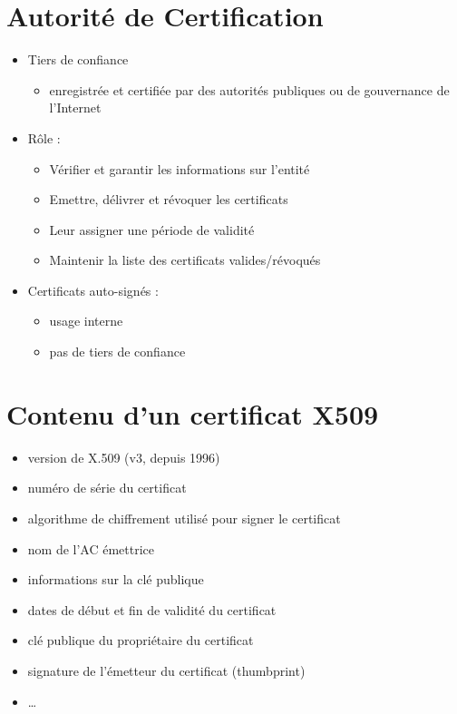 \hypertarget{autorituxe9-de-certification}{%
\section{Autorité de Certification}\label{autorituxe9-de-certification}}

\begin{itemize}
\tightlist
\item
  Tiers de confiance

  \begin{itemize}
  \tightlist
  \item
    enregistrée et certifiée par des autorités publiques ou de
    gouvernance de l'Internet
  \end{itemize}
\item
  Rôle :

  \begin{itemize}
  \tightlist
  \item
    Vérifier et garantir les informations sur l'entité
  \item
    Emettre, délivrer et révoquer les certificats
  \item
    Leur assigner une période de validité
  \item
    Maintenir la liste des certificats valides/révoqués
  \end{itemize}
\item
  Certificats auto-signés :

  \begin{itemize}
  \tightlist
  \item
    usage interne
  \item
    pas de tiers de confiance
  \end{itemize}
\end{itemize}

\hypertarget{contenu-dun-certificat-x509}{%
\section{Contenu d'un certificat
X509}\label{contenu-dun-certificat-x509}}

\begin{itemize}
\tightlist
\item
  version de X.509 (v3, depuis 1996)
\item
  numéro de série du certificat
\item
  algorithme de chiffrement utilisé pour signer le certificat
\item
  nom de l'AC émettrice
\item
  informations sur la clé publique
\item
  dates de début et fin de validité du certificat
\item
  clé publique du propriétaire du certificat
\item
  signature de l'émetteur du certificat (thumbprint)
\item
  \ldots{}
\end{itemize}

